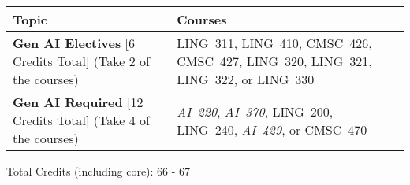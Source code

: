 \begin{longtable}{p{7cm}>{\raggedleft\arraybackslash}p{7cm}}
Topic & Courses \\
\toprule
\textbf{Gen AI Electives} [6 Credits Total] (Take 2 of the courses) & LING~311, LING~410, CMSC~426, CMSC~427, LING~320, LING~321, LING~322, or LING~330 \\
\textbf{Gen AI Required} [12 Credits Total] (Take 4 of the courses) & \textit{AI~220}, \textit{AI~370}, LING~200, LING~240, \textit{AI~429}, or CMSC~470 \\
\bottomrule
\end{longtable}
Total Credits (including core): 66 - 67

